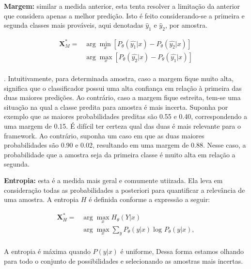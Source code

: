 \textbf{Margem:} similar a medida anterior, esta tenta resolver a limitação da anterior que considera apenas a melhor predição. Isto é feito considerando-se a primeira e segunda classes mais prováveis, aqui denotadas $\hat{y}_1$ e $\hat{y}_2$,  por amostra.

\begin{align*}
\textbf{X}^*_{M} = &\arg\min_{x}[ P_{\theta} (\hat{y_{1}}\lvert x) - P_{\theta} (\hat{y_{2}}\lvert x)]\\
&\arg\max_{x}[ P_{\theta} (\hat{y_{2}}\lvert x) - P_{\theta} (\hat{y_{1}}\lvert x)]\\
\end{align*}
 
.
Intuitivamente, para determinada amostra, caso a margem fique muito alta, significa que o classificador possui uma alta confiança em relação à primeira das duas maiores predições. Ao contrário, caso a margem fique estreita, tem-se uma situação na qual a classe predita para amostra é mais incerta. Suponha por exemplo que as maiores probabilidades preditas são 0.55 e 0.40, correspondendo a uma margem de 0.15. É difícil ter certeza qual das duas é mais relevante para o framework. Ao contrário, suponha um caso em que as duas maiores probabilidades são 0.90 e 0.02, resultando em uma margem de 0.88. Nesse caso, a probabilidade que a amostra seja da primeira classe é muito alta em relação a segunda. %

\textbf{Entropia:} esta é a medida mais geral e comumente utiizada. Ela leva em consideração todas as probabilidades a posteriori para quantificar a relevância de uma amostra. A entropia $H$ é definida conforme a expressão a seguir:

\begin{align*}
\textbf{X}^*_{H} = &\arg\max_{x} H_{\theta}  (Y\lvert x)\\
&\arg\max_{x} \sum_{y} P_{\theta}  (y\lvert x) \log_{} P_{\theta}  (y\lvert x),\\
\end{align*}

A entropia é máxima quando $P(y\lvert x)$ é uniforme,  Dessa forma estamos olhando para todo o conjunto de possibilidades e selecionando as amostras mais incertas.


